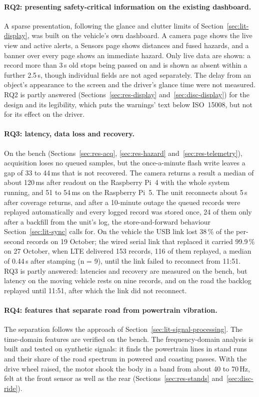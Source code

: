\paragraph{RQ2: presenting safety-critical information on the existing dashboard.} A sparse presentation, following the glance and clutter limits of Section~\ref{sec:lit-display}, was built on the vehicle's own dashboard. A camera page shows the live view and active alerts, a Sensors page shows distances and fused hazards, and a banner over every page shows an immediate hazard. Only live data are shown: a record more than 3\,s old stops being passed on and is shown as absent within a further 2.5\,s, though individual fields are not aged separately. The delay from an object's appearance to the screen and the driver's glance time were not measured. RQ2 is partly answered (Sections~\ref{sec:res-display} and~\ref{sec:disc-display}) for the design and its legibility, which puts the warnings' text below ISO~15008, but not for its effect on the driver.

\paragraph{RQ3: latency, data loss and recovery.} On the bench (Sections~\ref{sec:res-acq}, \ref{sec:res-hazard} and~\ref{sec:res-telemetry}), acquisition loses no queued samples, but the once-a-minute flash write leaves a gap of 33 to 44\,ms that is not recovered. The camera returns a result a median of about 120\,ms after readout on the Raspberry Pi~4 with the whole system running, and 51 to 54\,ms on the Raspberry Pi~5. The unit reconnects about 5\,s after coverage returns, and after a 10-minute outage the queued records were replayed automatically and every logged record was stored once, 24 of them only after a backfill from the unit's log, the store-and-forward behaviour Section~\ref{sec:lit-sync} calls for. On the vehicle the USB link lost 38\,\% of the per-second records on 19 October; the wired serial link that replaced it carried 99.9\,\% on 27 October, when LTE delivered 153 records, 116 of them replayed, a median of 0.44\,s after stamping (n = 9), until the link failed to reconnect from 11:51. RQ3 is partly answered: latencies and recovery are measured on the bench, but latency on the moving vehicle rests on nine records, and on the road the backlog replayed until 11:51, after which the link did not reconnect.

\paragraph{RQ4: features that separate road from powertrain vibration.} The separation follows the approach of Section~\ref{sec:lit-signal-processing}. The time-domain features are verified on the bench. The frequency-domain analysis is built and tested on synthetic signals: it finds the powertrain lines in stand runs and their share of the road spectrum in powered and coasting passes. With the drive wheel raised, the motor shook the body in a band from about 40 to 70\,Hz, felt at the front sensor as well as the rear (Sections~\ref{sec:res-stands} and~\ref{sec:disc-ride}).

